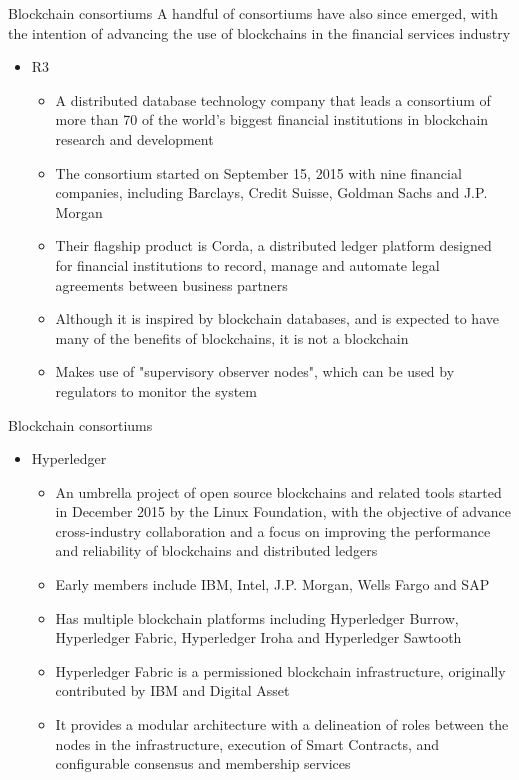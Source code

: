 \documentclass[9pt]{beamer}
\begin{document}

\begin{frame}{Blockchain consortiums}
	A handful of consortiums have also since emerged, with the intention of advancing the use of blockchains in the financial services industry
	\begin{itemize}
		\item R3
		\begin{itemize}
			\item A distributed database technology company that leads a consortium of more than 70 of the world's biggest financial institutions in blockchain research and development
			\item The consortium started on September 15, 2015 with nine financial companies, including Barclays, Credit Suisse, Goldman Sachs and J.P. Morgan
			\item Their flagship product is Corda, a distributed ledger platform designed for financial institutions to record, manage and automate legal agreements between business partners
			\item Although it is inspired by blockchain databases, and is expected to have many of the benefits of blockchains, it is not a blockchain
			\item Makes use of "supervisory observer nodes", which can be used by regulators to monitor the system
		\end{itemize}
	\end{itemize}
\end{frame}


\begin{frame}{Blockchain consortiums}
	\begin{itemize}
		\item Hyperledger
		\begin{itemize}
			\item An umbrella project of open source blockchains and related tools started in December 2015 by the Linux Foundation, with the objective of advance cross-industry collaboration and a focus on improving the performance and reliability of blockchains and distributed ledgers
			\item Early members include IBM, Intel, J.P. Morgan, Wells Fargo and SAP
			\item Has multiple blockchain platforms including Hyperledger Burrow, Hyperledger Fabric, Hyperledger Iroha and Hyperledger Sawtooth
			\item Hyperledger Fabric is a permissioned blockchain infrastructure, originally contributed by IBM and Digital Asset
			\item It provides a modular architecture with a delineation of roles between the nodes in the infrastructure, execution of Smart Contracts, and configurable consensus and membership services
		\end{itemize}
	\end{itemize}
\end{frame}
\end{document}
